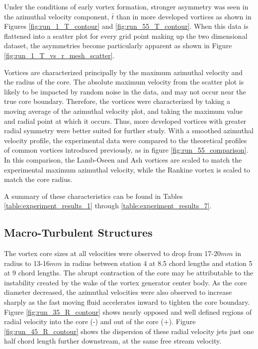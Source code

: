 


Under the conditions of early vortex formation, stronger asymmetry was seen in 
the azimuthal velocity component, $\bar{t}$ than in more developed vortices as 
shown in Figures \ref{fig:run_1_T_contour} and \ref{fig:run_55_T_contour}. When 
this data is flattened into a scatter plot for every grid point making up the 
two dimensional dataset, the asymmetries become particularly apparent as shown 
in Figure \ref{fig:run_1_T_vs_r_mesh_scatter}.





Vortices are characterized principally by the maximum azimuthal velocity 
and the radius of the core. The absolute maximum velocity from the scatter plot 
is likely to be impacted by random noise in the data, and may 
not occur near the true core boundary. Therefore, the vortices were 
characterized by taking a moving average of the azimuthal velocity plot, and 
taking the maximum value and radial point at which it occurs. Thus, more 
developed vortices with greater radial symmetry were better suited for further 
study. With a smoothed azimuthal velocity profile, the experimental data were 
compared to the theoretical profiles of common vortices introduced previously, 
as in figure \ref{fig:run_55_comparison}. In this comparison, the Lamb-Oseen 
and Ash vortices are scaled to match the experimental maximum azimuthal 
velocity, while the Rankine vortex is scaled to match the core radius.



A summary of these characteristics can be found in Tables 
\ref{table:experiment_results_1} through \ref{table:experiment_results_7}. 









\subsection{Macro-Turbulent Structures}
The vortex core sizes at all velocities were observed to drop from 
17-20$mm$ in radius to 13-16$mm$ in radius between station 4 at 8.5 chord 
lengths and station 5 at 9 chord lengths. The abrupt contraction of the core 
may be attributable to the instability created by the wake of the vortex 
generator center body. As the core diameter decreased, the azimuthal velocities 
were also observed to increase sharply as the fast moving fluid accelerates 
inward to tighten the core boundary. Figure \ref{fig:run_35_R_contour} shows 
nearly opposed and well defined regions of radial velocity into the core (-) 
and out of the core (+). Figure \ref{fig:run_45_R_contour} shows the dispersion 
of these radial velocity jets just one half chord length further downstream, at 
the same free stream velocity. 

